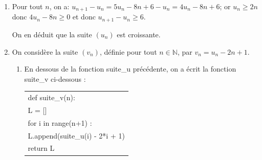 \documentclass[10pt]{article}
\providecommand{\N}{\mathbb{N}}
\providecommand{\ds}{\displaystyle}
\begin{document}
\begin{enumerate}
\begin{enumerate}

On a donc démontré que, pour tout entier naturel $n$, on a: $u_n\geqslant 2n$.		
		
		\item
$\ds\lim _{n\to +\infty} 2n=+\infty$ et $u_n\geqslant 2n$ donc $\ds\lim _{n\to +\infty} u_n = +\infty$.
		
		\item Soit $p \in \N^*$.
		
$\ds\lim _{n\to +\infty} u_n = +\infty$ donc, d'après la définition de la limite vers $+\infty$ d'une suite, pour tout réel $A>0$, il existe un rang $n_0$ à partir duquel tous les termes de la suite sont supérieurs à $A$; donc il existe un rang $n_0$ tel que si $n\geqslant n_0$, alors $u_{n_0}\geqslant 10^p$.
\end{enumerate}

\item 
Pour tout $n$, on a:
$u_{n+1}-u_n=5u_n-8n+6 -u_n = 4u_n - 8n +6$;
or $u_n\geqslant 2n$ donc $4u_n-8n\geqslant 0$ et donc $u_{n+1}-u_n\geqslant 6$.

On en déduit que la suite $(u_n)$ est croissante.

\item On considère la suite $\left(v_n\right)$, définie pour tout $n \in  \N$, par $v_n = u_n - 2n + 1$.
	\begin{enumerate}
		\item En dessous de la fonction {\ttfamily suite\_u} précédente, on a écrit la fonction {\ttfamily suite\_v} ci-dessous :
\begin{center}
\begin{tabular}{>{\ttfamily}l}
def suite\_v(n):\\
\qquad L = []\\
\qquad  for i in range(n+1) :\\
\qquad \vline \qquad L.append(suite\_u(i) - 2*i + 1)\\
\qquad return L
\end{tabular}
\end{center}




\end{enumerate}
\end{enumerate}
\end{document}
